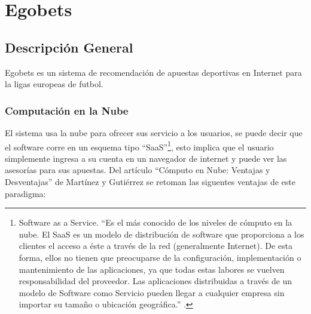 \chapter{Egobets}

\section{Descripción General}
Egobets es un sistema de recomendación de apuestas deportivas en Internet para la ligas europeas de futbol. 


\subsection{Computación en la Nube}

El sistema usa la nube para ofrecer sus servicio a los usuarios, se puede decir que el software corre en un esquema tipo ``SaaS''\footnote{Software as a Service. ``Es el más conocido de los niveles de cómputo en la nube. El SaaS es un modelo de distribución de software que proporciona a los clientes el acceso a éste a través de la red (generalmente Internet). De esta forma, ellos no tienen que preocuparse de la configuración, implementación o mantenimiento de las aplicaciones, ya que todas estas labores se vuelven responsabilidad del proveedor. Las aplicaciones distribuidas a través de un modelo de Software como Servicio pueden llegar a cualquier empresa sin importar su tamaño o ubicación geográfica.'' \cite{computoNube}.}, esto implica que el usuario simplemente ingresa a su cuenta en un navegador de internet y puede ver las asesorías para sus apuestas.
Del artículo ``Cómputo en Nube: Ventajas y Desventajas'' de Martínez y Gutiérrez \cite{computoNube}  se retoman las siguentes ventajas de este paradigma:
